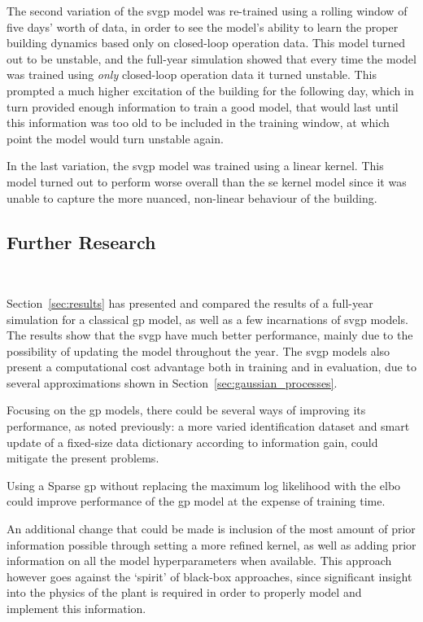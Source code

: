 The second variation of the \acrshort{svgp} model was re-trained using a rolling
window of five days' worth of data, in order to see the model's ability to learn 
the proper building dynamics based only on closed-loop operation data. This
model turned out to be unstable, and the full-year simulation showed that every
time the model was trained using \textit{only} closed-loop operation data it
turned unstable. This prompted a much higher excitation of the building for the
following day, which in turn provided enough information to train a good model,
that would last until this information was too old to be included in the
training window, at which point the model would turn unstable again.

In the last variation, the \acrshort{svgp} model was trained using a linear
kernel. This model turned out to perform worse overall than the \acrshort{se}
kernel model since it was unable to capture the more nuanced, non-linear
behaviour of the building.


\subsection{Further Research}~\label{sec:further_research}

Section~\ref{sec:results} has presented and compared the results of a full-year
simulation for a classical \acrshort{gp} model, as well as a few incarnations of
\acrshort{svgp} models. The results show that the \acrshort{svgp} have much
better performance, mainly due to the possibility of updating the model
throughout the year. The \acrshort{svgp} models also present a computational
cost advantage both in training and in evaluation, due to several approximations
shown in Section~\ref{sec:gaussian_processes}.

Focusing on the \acrlong{gp} models, there could be several ways of improving
its performance, as noted previously: a more varied identification dataset and
smart update of a fixed-size data dictionary according to information gain,
could mitigate the present problems.

Using a Sparse \acrshort{gp} without replacing the maximum log likelihood
with the \acrshort{elbo} could improve performance of the \acrshort{gp} model at
the expense of training time.

An additional change that could be made is inclusion of the most amount of prior
information possible through setting a more refined kernel, as well as adding
prior information on all the model hyperparameters when available. This approach
however goes against the `spirit' of black-box approaches, since significant
insight into the physics of the plant is required in order to properly model and
implement this information.

